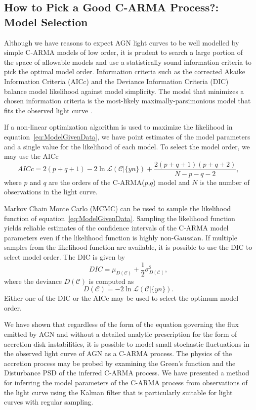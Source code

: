 \documentclass[a4paper,fleqn,usenatbib]{mnras}
\begin{document}
\subsection[Model Selection]{How to Pick a Good C-ARMA Process?: Model Selection}\label{sec:ModelSelection}

Although we have reasons to expect AGN light curves to be well modelled by simple C-ARMA models of low order, it is prudent to search a large portion of the space of allowable models and use a statistically sound information criteria to pick the optimal model order. Information criteria such as the corrected Akaike Information Criteria (AICc) and the Deviance Information Criteria (DIC) balance model likelihood against model simplicity. The model that minimizes a chosen information criteria is the most-likely maximally-parsimonious model that fits the observed light curve \citep{ModelSelection}.

If a non-linear optimization algorithm is used to maximize the likelihood in equation~\eqref{eq:ModelGivenData}, we have point estimates of the model parameters and a single value for the likelihood of each model. To select the model order, we may use the AICc
\begin{equation}\label{eq:AICc}
AICc = 2(p+q+1) - 2 \ln \mathcal{L}(\mathcal{C}|\{y{n}\}) + \frac{2(p+q+1)(p+q+2)}{N-p-q-2},
\end{equation}
where $p$ and $q$ are the orders of the C-ARMA($p$,$q$) model and $N$ is the number of observations in the light curve.

Markov Chain Monte Carlo (MCMC) can be used to sample the likelihood function of equation~\eqref{eq:ModelGivenData}. Sampling the likelihood function yields reliable estimates of the confidence intervals of the C-ARMA model parameters even if the likelihood function is highly non-Gaussian. If multiple samples from the likelihood function are available, it is possible to use the DIC to select model order. The DIC is given by
\begin{equation}\label{eq:DIC}
DIC = \mu_{D(\mathcal{C})} + \frac{1}{2}\sigma^{2}_{D(\mathcal{C})},
\end{equation}
where the deviance $D(\mathcal{C})$ is computed as
\begin{equation}\label{eq:Deviance}
D(\mathcal{C}) = -2\ln \mathcal{L}(\mathcal{C}|\{y{n}\}).
\end{equation}
Either one of the DIC or the AICc may be used to select the optimum model order.

We have shown that regardless of the form of the equation governing the flux emitted by AGN and without a detailed analytic prescription for the form of accretion disk instabilities, it is possible to model small stochastic fluctuations in the observed light curve of AGN as a C-ARMA process. The physics of the accretion process may be probed by examining the Green's function and the Disturbance PSD of the inferred C-ARMA process. We have presented a method for inferring the model parameters of the C-ARMA process from observations of the light curve using the Kalman filter that is particularly suitable for light curves with regular sampling.
\end{document}
